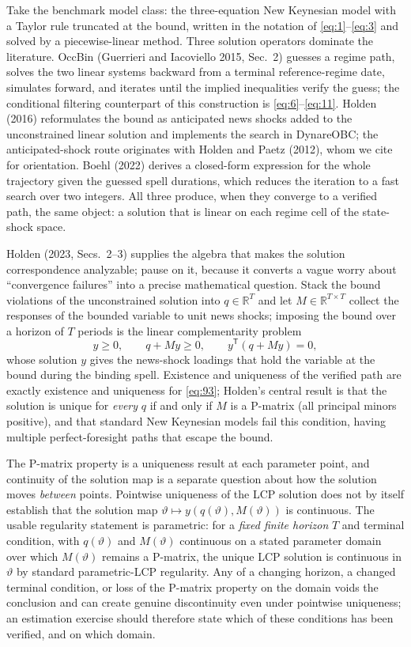 \documentclass[11pt]{article}
\begin{document}
Take the benchmark model class: the three-equation New Keynesian model with a
Taylor rule truncated at the bound, written in the notation of
\eqref{eq:1}--\eqref{eq:3} and solved by a piecewise-linear method. Three
solution operators dominate the literature. OccBin (Guerrieri and Iacoviello
2015, Sec.~2) guesses a regime path, solves the two linear systems backward
from a terminal reference-regime date, simulates forward, and iterates until
the implied inequalities verify the guess; the conditional filtering
counterpart of this construction is \eqref{eq:6}--\eqref{eq:11}. Holden (2016)
reformulates the bound as anticipated news shocks added to the unconstrained
linear solution and implements the search in DynareOBC; the anticipated-shock
route originates with Holden and Paetz (2012), whom we cite for orientation.
Boehl (2022) derives a closed-form expression for the whole trajectory given
the guessed spell durations, which reduces the iteration to a fast search over
two integers. All three produce, when they converge to a verified path, the
same object: a solution that is linear on each regime cell of the state-shock
space.

Holden (2023, Secs.~2--3) supplies the algebra that makes the solution
correspondence analyzable; pause on it, because it converts a
vague worry about ``convergence failures'' into a precise mathematical
question. Stack the bound violations of the unconstrained solution into
$q\in\mathbb R^{T}$ and let $M\in\mathbb R^{T\times T}$ collect the responses
of the bounded variable to unit news shocks; imposing the bound over a horizon
of $T$ periods is the linear complementarity problem
\begin{equation}\label{eq:93}
 y\geq0,\qquad q+My\geq0,\qquad y^{\mathsf T}(q+My)=0,
\end{equation}
whose solution $y$ gives the news-shock loadings that hold the variable at the
bound during the binding spell. Existence and uniqueness of the verified path
are exactly existence and uniqueness for \eqref{eq:93}; Holden's central
result is that the solution is unique for \emph{every} $q$ if and only if $M$
is a P-matrix (all principal minors positive), and that standard New Keynesian
models fail this condition, having multiple perfect-foresight paths that
escape the bound.

The P-matrix property is a uniqueness result at each parameter point, and
continuity of the solution map is a separate question about how the solution
moves \emph{between} points. Pointwise uniqueness of the LCP solution does
not by itself establish that the solution map
$\vartheta\mapsto y(q(\vartheta),M(\vartheta))$ is continuous. The usable
regularity statement is parametric: for a \emph{fixed finite horizon} $T$ and
terminal condition, with $q(\vartheta)$ and $M(\vartheta)$ continuous on a
stated parameter domain over which $M(\vartheta)$ remains a P-matrix, the
unique LCP solution is continuous in $\vartheta$ by standard parametric-LCP
regularity. Any of a changing horizon, a changed terminal condition, or loss
of the P-matrix property on the domain voids the conclusion and can create
genuine discontinuity even under pointwise uniqueness; an estimation exercise
should therefore state which of these conditions has been verified, and on
which domain.
\end{document}
